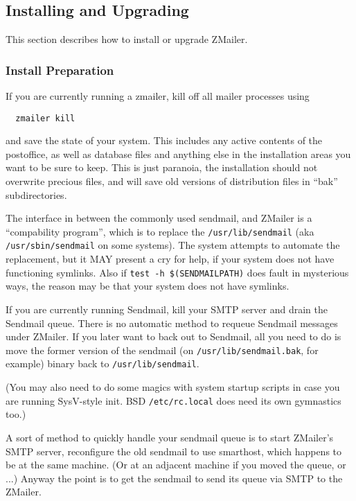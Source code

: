 \subsection{Installing and Upgrading}

This section describes how to install or upgrade ZMailer.


\subsubsection{Install Preparation}

If you are currently running a zmailer, kill off all mailer processes
using
\begin{verbatim}
  zmailer kill
\end{verbatim}

and save the state of your system.  This includes any active
contents of the postoffice, as well as database files and
anything else in the installation areas you want to be sure
to keep.  This is just paranoia, the installation should not
overwrite precious files, and will save old versions of
distribution files in ``bak'' subdirectories.

The interface in between the commonly used sendmail, and ZMailer
is a ``compability program'', which is to replace the {\tt /usr/lib/sendmail}
(aka {\tt /usr/sbin/sendmail} on some systems).
The system attempts to automate the replacement, but it MAY present
a cry for help, if your system does not have functioning symlinks.
Also if {\tt test -h \$(SENDMAILPATH)} does fault in mysterious ways,
the reason may be that your system does not have symlinks.

If you are currently running Sendmail, kill your SMTP server
and drain the Sendmail queue.  There is no automatic method
to requeue Sendmail messages under ZMailer.  If you later want
to back out to Sendmail, all you need to do is move the former
version of the sendmail (on {\tt /usr/lib/sendmail.bak}, for example)
binary back to {\tt /usr/lib/sendmail}.

(You may also need to do some magics with system startup scripts
in case you are running SysV-style init. BSD {\tt /etc/rc.local}
does need its own gymnastics too.)

A sort of method to quickly handle your sendmail queue is to
start ZMailer's SMTP server, reconfigure the old sendmail to
use smarthost, which happens to be at the same machine.
(Or at an adjacent machine if you moved the queue, or ...)
Anyway the point is to get the sendmail to send its queue
via SMTP to the ZMailer.


